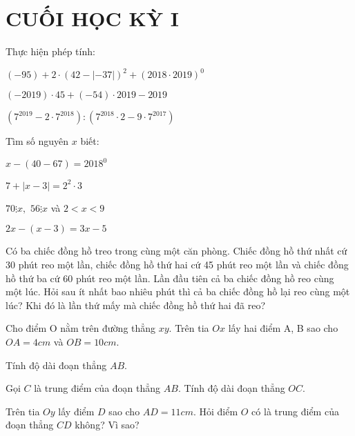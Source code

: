 \section{CUỐI HỌC KỲ I}
\setcounter{ex}{0}
\begin{ex}
	Thực hiện phép tính:
	\begin{listEX}
	\item $\left( { - 95} \right) + 2 \cdot {\left( {42 - \left| { - 37} \right|} \right)^2} + {\left( {2018 \cdot 2019} \right)^0}$
\item $\left( { - 2019} \right) \cdot 45 + \left( { - 54} \right) \cdot 2019 - 2019$
\item $\left( {{7^{2019}} - 2 \cdot {7^{2018}}} \right):\left( {{7^{2018}} \cdot 2 - 9 \cdot {7^{2017}}} \right)$
	\end{listEX}
\end{ex}
\begin{ex}
	Tìm số nguyên $x$ biết:
	\begin{listEX}[2]
	\item $x - \left( {40 - 67} \right) = {2018^0}$
\item $7 + \left| {x - 3} \right| = {2^2} \cdot 3$ 
\item $70 \vdots x,\,\,56 \vdots x$  và  $2 < x < 9$
\item $2x - \left( {x - 3} \right) = 3x - 5$ 
	\end{listEX}
\end{ex}
\begin{ex}
	Có ba chiếc đồng hồ treo trong cùng một căn phòng. Chiếc đồng hồ thứ nhất cứ 30 phút reo một lần, chiếc đồng hồ thứ hai cứ 45 phút reo một lần và chiếc đồng hồ thứ ba cứ 60 phút reo một lần. Lần đầu tiên cả ba chiếc đồng hồ reo cùng một lúc. Hỏi sau ít nhất bao nhiêu phút thì cả ba chiếc đồng hồ lại reo cùng một lúc? Khi đó là lần thứ mấy mà chiếc đồng hồ thứ hai đã reo?
\end{ex}
\begin{ex}
	Cho điểm O nằm trên đường thẳng $xy$. Trên tia $Ox$ lấy hai điểm A, B sao cho $OA = 4cm$ và $OB = 10cm$.
		\begin{listEX}
			\item Tính độ dài đoạn thẳng $AB$.
\item Gọi $C$ là trung điểm của đoạn thẳng $AB$. Tính độ dài đoạn thẳng $OC$.
\item Trên tia $Oy$ lấy điểm $D$ sao cho $AD = 11cm$. Hỏi điểm $O$ có là trung điểm của đoạn thẳng $CD$ không? Vì sao?
		\end{listEX}
\end{ex}
